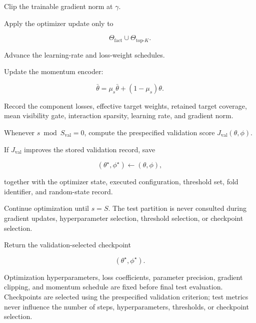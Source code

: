 \begin{tcolorbox}
\begin{algsteps}
\item
Clip the trainable gradient norm at \(\gamma\).

\item
Apply the optimizer update only to

\[
\Theta_{\mathrm{fact}}
\cup
\Theta_{\mathrm{top}\text{-}K}.
\]

\item
Advance the learning-rate and loss-weight schedules.

\item
Update the momentum encoder:

\[
\bar\theta
=
\mu_s\bar\theta
+
(1-\mu_s)\theta.
\]

\item
Record the component losses, effective target weights, retained target
coverage, mean visibility gate, interaction sparsity, learning rate,
and gradient norm.


\item
Whenever \(s\bmod S_{\mathrm{val}}=0\), compute the prespecified
validation score \(J_{\mathrm{val}}(\theta,\phi)\).

\item
If \(J_{\mathrm{val}}\) improves the stored validation record, save

\[
(\theta^\star,\phi^\star)
\gets
(\theta,\phi),
\]

together with the optimizer state, executed configuration, threshold
set, fold identifier, and random-state record.

\item
Continue optimization until \(s=S\). The test partition is never
consulted during gradient updates, hyperparameter selection, threshold
selection, or checkpoint selection.


\item
Return the validation-selected checkpoint

\[
(\theta^\star,\phi^\star).
\]

\end{algsteps}
\end{tcolorbox}

Optimization hyperparameters, loss coefficients, parameter precision,
gradient clipping, and momentum schedule are fixed before final test
evaluation. Checkpoints are selected using the prespecified validation
criterion; test metrics never influence the number of steps,
hyperparameters, thresholds, or checkpoint selection.
\fi  %


